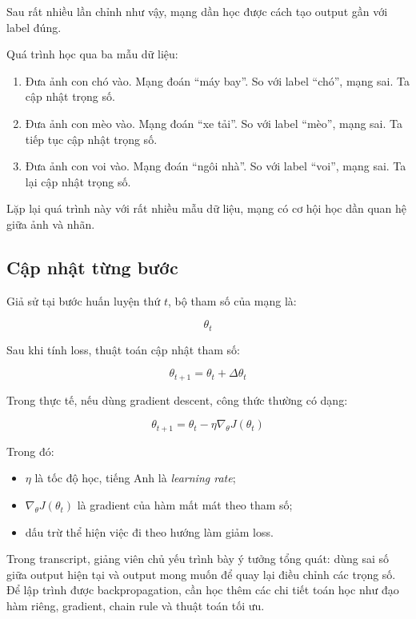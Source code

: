 Sau rất nhiều lần chỉnh như vậy, mạng dần học được cách tạo output gần với label đúng.

\begin{vidu}
Quá trình học qua ba mẫu dữ liệu:

\begin{enumerate}
    \item Đưa ảnh con chó vào. Mạng đoán ``máy bay''. So với label ``chó'', mạng sai. Ta cập nhật trọng số.
    \item Đưa ảnh con mèo vào. Mạng đoán ``xe tải''. So với label ``mèo'', mạng sai. Ta tiếp tục cập nhật trọng số.
    \item Đưa ảnh con voi vào. Mạng đoán ``ngôi nhà''. So với label ``voi'', mạng sai. Ta lại cập nhật trọng số.
\end{enumerate}

Lặp lại quá trình này với rất nhiều mẫu dữ liệu, mạng có cơ hội học dần quan hệ giữa ảnh và nhãn.
\end{vidu}

\subsection{Cập nhật từng bước}

Giả sử tại bước huấn luyện thứ $t$, bộ tham số của mạng là:

\[
    \theta_t
\]

Sau khi tính loss, thuật toán cập nhật tham số:

\[
    \theta_{t+1} = \theta_t + \Delta \theta_t
\]

Trong thực tế, nếu dùng gradient descent, công thức thường có dạng:

\[
    \theta_{t+1} = \theta_t - \eta \nabla_{\theta} J(\theta_t)
\]

Trong đó:

\begin{itemize}
    \item $\eta$ là tốc độ học, tiếng Anh là \textit{learning rate};
    \item $\nabla_{\theta} J(\theta_t)$ là gradient của hàm mất mát theo tham số;
    \item dấu trừ thể hiện việc đi theo hướng làm giảm loss.
\end{itemize}

\begin{luuy}
Trong transcript, giảng viên chủ yếu trình bày ý tưởng tổng quát: dùng sai số giữa output hiện tại và output mong muốn để quay lại điều chỉnh các trọng số. Để lập trình được backpropagation, cần học thêm các chi tiết toán học như đạo hàm riêng, gradient, chain rule và thuật toán tối ưu.
\end{luuy}

